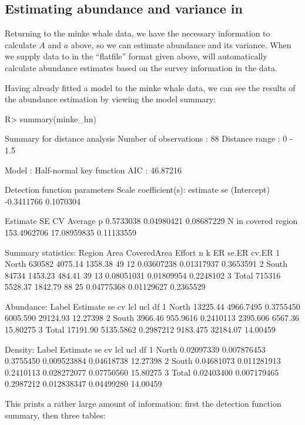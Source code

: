 \documentclass[article]{jss}\usepackage[]{graphicx}\usepackage[]{color}
\begin{document}
\subsection[Estimating abundance and variance in R]{Estimating abundance and variance in }

Returning to the minke whale data, we have the necessary information to calculate $A$ and $a$ above, so we can estimate abundance and its variance. When we supply data to  in the ``flatfile'' format given above,  will automatically calculate abundance estimates based on the survey information in the data.

Having already fitted a model to the minke whale data, we can see the results of the abundance estimation by viewing the model summary:
\begin{Schunk}
\begin{Sinput}
R> summary(minke_hn)
\end{Sinput}
\begin{Soutput}

Summary for distance analysis 
Number of observations :  88 
Distance range         :  0  -  1.5 

Model : Half-normal key function 
AIC   : 46.87216 

Detection function parameters
Scale coefficient(s):  
              estimate        se
(Intercept) -0.3411766 0.1070304

                       Estimate          SE         CV
Average p             0.5733038  0.04980421 0.08687229
N in covered region 153.4962706 17.08959835 0.11133559

Summary statistics:
  Region   Area CoveredArea  Effort  n  k         ER      se.ER     cv.ER
1  North 630582     4075.14 1358.38 49 12 0.03607238 0.01317937 0.3653591
2  South  84734     1453.23  484.41 39 13 0.08051031 0.01809954 0.2248102
3  Total 715316     5528.37 1842.79 88 25 0.04775368 0.01129627 0.2365529

Abundance:
  Label Estimate        se        cv      lcl      ucl       df
1 North 13225.44 4966.7495 0.3755450 6005.590 29124.93 12.27398
2 South  3966.46  955.9616 0.2410113 2395.606  6567.36 15.80275
3 Total 17191.90 5135.5862 0.2987212 9183.475 32184.07 14.00459

Density:
  Label   Estimate          se        cv         lcl        ucl       df
1 North 0.02097339 0.007876453 0.3755450 0.009523884 0.04618738 12.27398
2 South 0.04681073 0.011281913 0.2410113 0.028272077 0.07750560 15.80275
3 Total 0.02403400 0.007179465 0.2987212 0.012838347 0.04499280 14.00459
\end{Soutput}
\end{Schunk}
This prints a rather large amount of information: first the detection function summary, then three tables:
\end{document}
